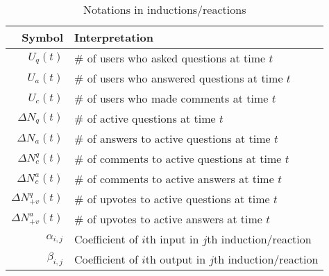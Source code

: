 \iffalse
\begin{figure}
  \centering
  \tikz{ %
    \node[latent] (alpha) {$\alpha$} ; %
    \node[latent, right=of alpha] (theta) {$\theta$} ; %
    \node[latent, right=of theta] (z) {z} ; %
    \node[latent, above=of z] (beta) {$\beta$} ; %
    \node[obs, right=of z] (w) {w} ; %
    \plate[inner sep=0.25cm, xshift=-0.12cm, yshift=0.12cm] {plate1} {(z) (w)} {N}; %
    \plate[inner sep=0.25cm, xshift=-0.12cm, yshift=0.12cm] {plate2} {(theta) (plate1)} {M}; %
    \edge {alpha} {theta} ; %
    \edge {theta} {z} ; %
    \edge {z,beta} {w} ; %
  }
\end{figure}
\fi

\begin{figure}
  \centering
\end{figure}

\begin{table}[hbt]
	\centering
	\begin{tabular}{rl}
	\toprule
	\textbf{Symbol} & \textbf{Interpretation}\\ \midrule
	$U_q(t)$ & \# of users who asked questions at time $t$\\
	$U_a(t)$ & \# of users who answered questions at time $t$\\
	$U_c(t)$ & \# of users who made comments at time $t$\\
	$\Delta N_q(t)$ & \# of active questions at time $t$\\
	$\Delta N_a(t)$ & \# of answers to active questions at time $t$\\
	$\Delta N_c^q(t)$ & \# of comments to active questions at time $t$\\
	$\Delta N_c^a(t)$ & \# of comments to active answers at time $t$\\
	$\Delta N_{+v}^q(t)$ & \# of upvotes to active questions at time $t$\\
	$\Delta N_{+v}^a(t)$ & \# of upvotes to active answers at time $t$\\
	$\alpha_{i, j}$ & Coefficient of $i$th input in $j$th induction/reaction\\
	$\beta_{i, j}$ & Coefficient of $i$th output in $j$th induction/reaction\\ \bottomrule
	 \end{tabular}
    \caption{Notations in inductions/reactions}
\end{table}